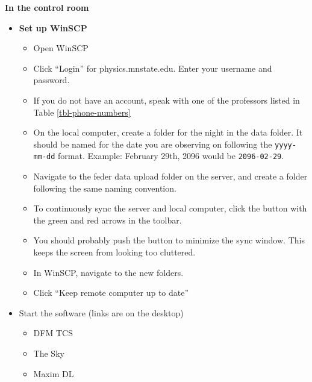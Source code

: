 \documentclass[letterpaper, 12pt]{report}
\begin{document}
{\large\textbf{In the control room}}
\begin{itemize}
	\item \textbf{Set up WinSCP}
	\begin{itemize}
		\item Open WinSCP
		\item Click ``Login'' for physics.mnstate.edu. Enter your username and password.
		\item If you do not have an account, speak with one of the professors listed in Table \ref{tbl-phone-numbers}
		\item On the local computer, create a folder for the night in the data folder. It should be named for the date you are observing on following the \texttt{yyyy-mm-dd} format. Example: February 29th, 2096 would be \texttt{2096-02-29}.
		\item Navigate to the feder data upload folder on the server, and create a folder following the same naming convention.
		\item To continuously sync the server and local computer, click the button with the green and red arrows in the toolbar.
		\item You should probably push the button to minimize the sync window. This keeps the screen from looking too cluttered.
		\item In WinSCP, navigate to the new folders.
		\item Click ``Keep remote computer up to date''
	\end{itemize}
	\item Start the software (links are on the desktop)
	\begin{itemize}
		\item DFM TCS
		\item The Sky
		\item Maxim DL
	\end{itemize}

\end{itemize}
\end{document}
